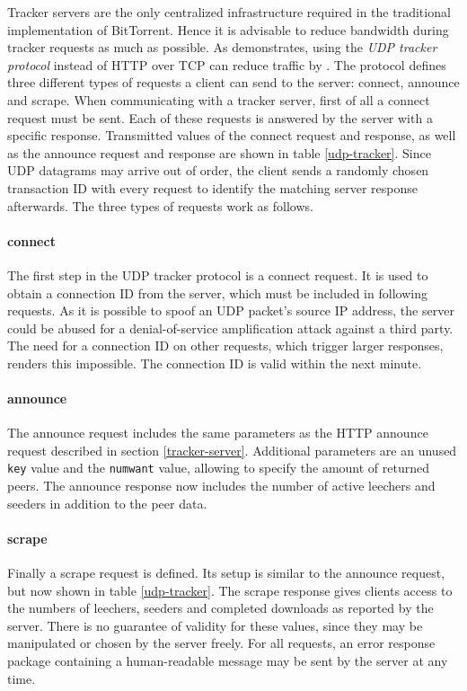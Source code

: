 \documentclass[10pt, a4paper, twoside, headsepline]{scrbook}
\renewcommand{\_}{\origunderscore\allowbreak}
\begin{document}
Tracker servers are the only centralized infrastructure required in the traditional implementation of BitTorrent. Hence it is advisable to reduce bandwidth during tracker requests as much as possible. As \cite{bep15} demonstrates, using the \emph{UDP tracker protocol} instead of HTTP over TCP can reduce traffic by . The protocol defines three different types of requests a client can send to the server: connect, announce and scrape. When communicating with a tracker server, first of all a connect request must be sent. Each of these requests is answered by the server with a specific response. Transmitted values of the connect request and response, as well as the announce request and response are shown in table \ref{udp-tracker}. Since UDP datagrams may arrive out of order, the client sends a randomly chosen transaction ID with every request to identify the matching server response afterwards. The three types of requests work as follows.

\paragraph{connect}
The first step in the UDP tracker protocol is a connect request. It is used to obtain a connection ID from the server, which must be included in following requests. As it is possible to spoof an UDP packet's source IP address, the server could be abused for a denial-of-service amplification attack against a third party. The need for a connection ID on other requests, which trigger larger responses, renders this impossible. The connection ID is valid within the next minute.

\paragraph{announce}
The announce request includes the same parameters as the HTTP announce request described in section \ref{tracker-server}. Additional parameters are an unused \texttt{key} value and the \texttt{num\_want} value, allowing to specify the amount of returned peers. The announce response now includes the number of active leechers and seeders in addition to the peer data.

\paragraph{scrape}
Finally a scrape request is defined. Its setup is similar to the announce request, but now shown in table \ref{udp-tracker}. The scrape response gives clients access to the numbers of leechers, seeders and completed downloads as reported by the server. There is no guarantee of validity for these values, since they may be manipulated or chosen by the server freely. For all requests, an error response package containing a human-readable message may be sent by the server at any time.
\end{document}
